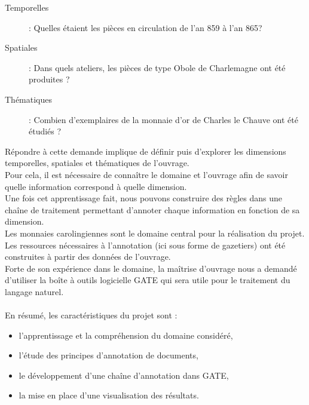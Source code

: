 \documentclass[a4paper, 11pt]{report}
\begin{document}
\begin{description}
\item [Temporelles] : Quelles étaient les pièces en circulation de l'an 859 à l'an 865?
\item [Spatiales] : Dans quels ateliers, les pièces de type Obole de Charlemagne ont été produites ? 
\item [Thématiques] : Combien d'exemplaires de la monnaie d'or de Charles le Chauve ont été étudiés ?
\end{description}

Répondre à cette demande implique de définir puis d'explorer les dimensions temporelles, spatiales et thématiques de l'ouvrage.\\
Pour cela, il est nécessaire de connaître le domaine et l'ouvrage afin de savoir quelle information correspond à quelle dimension.\\
Une fois cet apprentissage fait, nous pouvons construire des règles dans une chaîne de traitement permettant d'annoter chaque information en fonction de sa dimension. \\

Les monnaies carolingiennes sont le domaine central pour la réalisation du projet. Les ressources nécessaires à l'annotation (ici sous forme de gazetiers) ont été construites à partir des données de l'ouvrage.\\

Forte de son expérience dans le domaine, la maîtrise d'ouvrage nous a demandé d'utiliser la boîte à outils logicielle GATE qui sera utile pour le traitement du langage naturel.\\~\\

En résumé, les caractéristiques du projet sont : 
\begin{itemize}
\item l'apprentissage et la compréhension du domaine considéré,
\item l'étude des principes d'annotation de documents,
\item le développement d'une chaîne d'annotation dans GATE,
\item la mise en place d'une visualisation des résultats.
\end{itemize}

\newpage
\end{document}
